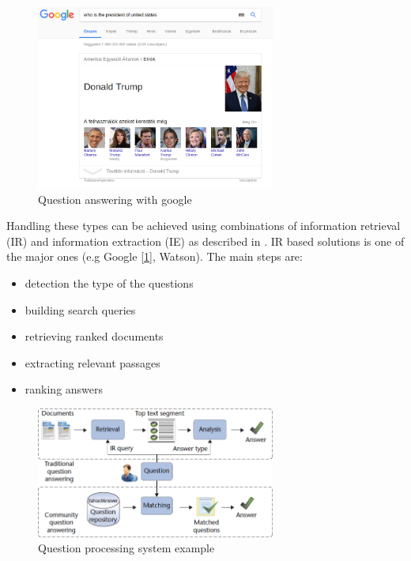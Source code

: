 \begin{figure}[h!]
	\centering
	\includegraphics[width=0.7\textwidth]{figures/qagoogle}
	\caption{Question answering with google}
	\label{fig:qa}
\end{figure}

Handling these types can be achieved using combinations of information retrieval (IR) and information extraction (IE) as described in \cite{Ralph:2017}.
IR based solutions is one of the major ones (e.g Google [\ref{fig:qa}], Watson). The main steps are:
\begin{itemize}
	\item detection the type of the questions
	\item building search queries
	\item retrieving ranked documents
	\item extracting relevant passages
	\item ranking answers
\end{itemize}

\begin{figure}[h!]
	\centering
	\includegraphics[width=0.7\textwidth]{figures/ie}
	\caption{Question processing system example \cite{IEsystem}}
	\label{fig:ie}
\end{figure}

